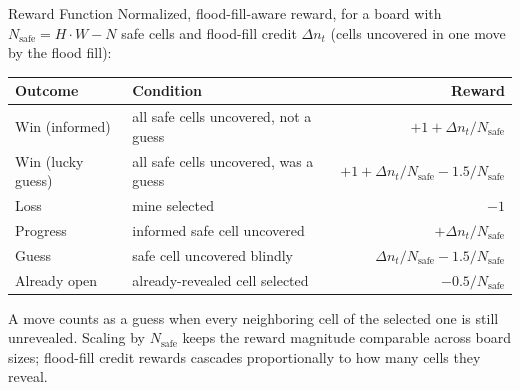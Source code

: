 \begin{frame}{Reward Function}
  \small
  Normalized, flood-fill-aware reward, for a board with $N_{\text{safe}}
  = H \cdot W - N$ safe cells and flood-fill credit $\Delta n_t$ (cells
  uncovered in one move by the flood fill):
  \begin{table}
    \centering
    \renewcommand{\arraystretch}{0.95}
    \begin{tabularx}{\textwidth}{l X r}
      \toprule
      \textbf{Outcome} & \textbf{Condition} & \textbf{Reward} \\
      \midrule
      Win (informed) & all safe cells uncovered, not a guess & $+1 + \Delta n_t / N_{\text{safe}}$ \\
      Win (lucky guess) & all safe cells uncovered, was a guess & $+1 + \Delta n_t / N_{\text{safe}} - 1.5/N_{\text{safe}}$ \\
      Loss           & mine selected                   & $-1$ \\
      Progress       & informed safe cell uncovered     & $+\Delta n_t / N_{\text{safe}}$ \\
      Guess          & safe cell uncovered blindly      & $\Delta n_t / N_{\text{safe}} - 1.5/N_{\text{safe}}$ \\
      Already open   & already-revealed cell selected   & $-0.5/N_{\text{safe}}$ \\
      \bottomrule
    \end{tabularx}
  \end{table}
  A move counts as a \alert{guess} when every neighboring cell of the
  selected one is still unrevealed. Scaling by $N_{\text{safe}}$ keeps
  the reward magnitude comparable across board sizes; flood-fill credit
  rewards cascades proportionally to how many cells they reveal.
\end{frame}
